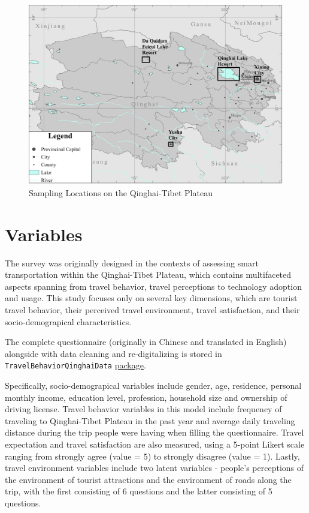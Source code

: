 \documentclass[
11pt, %
oneside, %
english, %
singlespacing, %
]{macthesis} %
\begin{document}
\begin{figure}

{\centering \includegraphics[width=0.8\linewidth]{figure/SampleLocations} 

}

\caption{\label{fig:SampleLocations}Sampling Locations on the Qinghai-Tibet Plateau}\label{fig:fig1-sample-locations}
\end{figure}

\section{Variables}\label{variables}

The survey was originally designed in the contexts of assessing smart transportation within the Qinghai-Tibet Plateau, which contains multifaceted aspects spanning from travel behavior, travel perceptions to technology adoption and usage. This study focuses only on several key dimensions, which are tourist travel behavior, their perceived travel environment, travel satisfaction, and their socio-demograpical characteristics.

The complete questionnaire (originally in Chinese and translated in English) alongside with data cleaning and re-digitalizing is stored in \texttt{TravelBehaviorQinghaiData} \href{https://github.com/Horan517/TravelBehaviorQinghaiData}{package}.

Specifically, socio-demograpical variables include gender, age, residence, personal monthly income, education level, profession, household size and ownership of driving license. Travel behavior variables in this model include frequency of traveling to Qinghai-Tibet Plateau in the past year and average daily traveling distance during the trip people were having when filling the questionnaire. Travel expectation and travel satisfaction are also measured, using a 5-point Likert scale ranging from strongly agree (value = 5) to strongly disagree (value = 1). Lastly, travel environment variables include two latent variables - people's perceptions of the environment of tourist attractions and the environment of roads along the trip, with the first consisting of 6 questions and the latter consisting of 5 questions.
\end{document}
